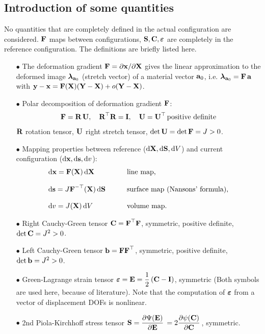 \subsection{Introduction of some quantities}
No quantities that are completely defined in the actual configuration are considered. $\textbf{F}$ maps between configurations, $\textbf{S}, \textbf{C}, \boldsymbol{\varepsilon}$ are completely in the reference configuration.
The definitions are briefly listed here.
\begin{itemize}
\item[$\bullet$] The deformation gradient $\textbf{F} = \partial{\textbf{x}}/\partial{\textbf{X}}$ gives the linear approximation to the deformed image $\boldsymbol{\lambda}_{\textbf{a}_0}$ (stretch vector) of a material vector $\textbf{a}_0$, i.e. $\boldsymbol{\lambda}_{\textbf{a}_0} = \textbf{F}\,\textbf{a}$ with $\textbf{y} - \textbf{x} = \textbf{F}(\textbf{X})(\textbf{Y}-\textbf{X}) + o(\textbf{Y}-\textbf{X})$.
\item[$\bullet$] Polar decomposition of deformation gradient $\textbf{F}$:
\begin{equation*}
  \begin{array}{lll}
    \textbf{F} = \textbf{R}\,\textbf{U}, \quad \textbf{R}^\top\textbf{R} = \textbf{I}, \quad \textbf{U} = \textbf{U}^\top \,\text{positive definite}
  \end{array}
\end{equation*}
$\textbf{R}$ rotation tensor, $\textbf{U}$ right stretch tensor, $\hbox{det} \, \textbf{U} = \hbox{det} \, \textbf{F} = J > 0$.
%
\item[$\bullet$] Mapping properties between reference ($\d\bfX, \d\bfS, \d V$) and current configuration ($\d\bfx, \d\bfs, \d v$):
\begin{equation*}
  \begin{array}{lll}
    \d\bfx = \bfF(\bfX)\,\d\bfX \qquad &\text{line map,}\\[4mm]
    \d\bfs = J\bfF^{-\top}(\bfX)\,\d\bfS \qquad & \text{surface map (Nansons' formula),}\\[4mm]
    \d v = J(\bfX)\,\d V \qquad & \text{volume map.}
  \end{array}
\end{equation*}
%
\item[$\bullet$] Right Cauchy-Green tensor $\textbf{C} = \textbf{F}^\top \textbf{F}$, symmetric, positive definite, $\hbox{det} \, \textbf{C} = J^2 > 0$.
\item[$\bullet$] Left Cauchy-Green tensor $\textbf{b} = \textbf{F}\textbf{F}^\top$, symmetric, positive definite, $\hbox{det} \, \textbf{b} = J^2 > 0$.
\item[$\bullet$] Green-Lagrange strain tensor $\boldsymbol{\varepsilon} = \textbf{E} =\displaystyle\frac{\displaystyle{1}}{\displaystyle{2}}\,(\textbf{C} - \textbf{I})$, symmetric (Both symbols are used here, because of literature). Note that the computation of $\boldsymbol{\varepsilon}$ from a vector of displacement DOFs is nonlinear.
\item[$\bullet$] 2nd Piola-Kirchhoff stress tensor $\bfS = \p{\Psi(\bfE)}{\bfE} = 2\p{\psi(\bfC)}{\bfC}$, symmetric.
\end{itemize}

